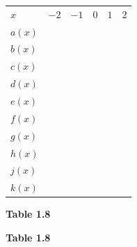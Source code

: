 \begin{table}[H]
\begin{center}
\label{m39345*id240930}
\noindent
{}
\tablelasttail{}
\begin{xtabular}[t]{|l|l|l|l|l|l|}\hline
    $x$
    &
    $-2$
    &
    $-1$
    &
    $0$
    &
    $1$
    &
    $2$
\tabularnewline{}
    $a\left(x\right)$
    &
&
&
&
&
\tabularnewline{}
    $b\left(x\right)$
    &
&
&
&
&
\tabularnewline{}
    $c\left(x\right)$
    &
&
&
&
&
\tabularnewline{}
    $d\left(x\right)$
    &
&
&
&
&
\tabularnewline{}
    $e\left(x\right)$
    &
&
&
&
&
\tabularnewline{}
    $f\left(x\right)$
    &
&
&
&
&
\tabularnewline{}
    $g\left(x\right)$
    &
&
&
&
&
\tabularnewline{}
    $h\left(x\right)$
    &
&
&
&
&
\tabularnewline{}
    $j\left(x\right)$
    &
&
&
&
&
\tabularnewline{}
    $k\left(x\right)$
    &
&
&
&
&
\tabularnewline{}
\end{xtabular}
\end{center}
\begin{center}{\small\bfseries Table 1.8}\end{center}
\begin{caption}{\small\bfseries Table 1.8}\end{caption}
\end{table}
